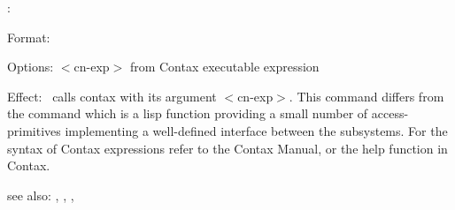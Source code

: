 \colab{} \cn:

Format: 

Options: $<$cn-exp$>$ from Contax executable expression

Effect: \cn \ calls contax with its argument $<$cn-exp$>$.
        This command differs from the command 
        which is a lisp function providing a small number of 
        access-primitives implementing a well-defined interface 
        between the \COLAB{} subsystems. For the syntax of Contax 
        expressions refer to the Contax Manual, or the help function
	in Contax.

see also: \col, \rf, \fw, \tx
